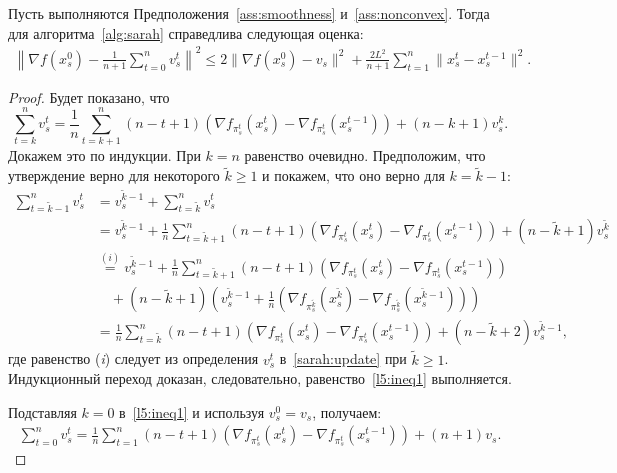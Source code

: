 \begin{lemma}\label{lemma5}
Пусть выполняются Предположения~\ref{ass:smoothness} и~\ref{ass:nonconvex}. Тогда для алгоритма~\ref{alg:sarah} справедлива следующая оценка:
\begin{align*}
    \left\| \nabla f(x_s^0) - \frac{1}{n+1}\sum\limits_{t=0}^n v_s^t\right\|^2 \leqslant 2\|\nabla f(x_{s}^0) - v_s \|^2 + \frac{2L^2}{n+1}\sum\limits_{t=1}^n \|x_s^t - x_s^{t-1}\|^2.
\end{align*}

\begin{proof}
Будет показано, что
\begin{equation}
\label{l5:ineq1}
    \sum\limits_{t=k}^n v_s^t = \frac{1}{n} \sum\limits_{t = k+1}^n (n-t+1)\left(\nabla f_{\pi_s^t}(x_s^t) - \nabla f_{\pi_s^t}(x_s^{t-1})\right) + (n-k+1)v_s^k.
\end{equation}
Докажем это по индукции. При $k = n$ равенство очевидно. Предположим, что утверждение верно для некоторого $\widetilde{k} \geqslant 1$ и покажем, что оно верно для $k = \widetilde{k}-1$:
\begin{align*}
    \sum\limits_{t=\widetilde{k}-1}^n v_s^t &= v_s^{\widetilde{k}-1} + \sum\limits_{t=\widetilde{k}}^n v_s^t \\
    &= v_s^{\widetilde{k}-1} + \frac{1}{n} \sum\limits_{t = \widetilde{k}+1}^n (n-t+1)\left(\nabla f_{\pi_s^t}(x_s^t) - \nabla f_{\pi_s^t}(x_s^{t-1})\right) + (n-\widetilde{k}+1)v_s^{\widetilde{k}} \\
    & \overset{(i)}{=} v_s^{\widetilde{k}-1} + \frac{1}{n} \sum\limits_{t = \widetilde{k}+1}^n (n-t+1)\left(\nabla f_{\pi_s^t}(x_s^t) - \nabla f_{\pi_s^t}(x_s^{t-1})\right) \\
    &\quad + (n-\widetilde{k}+1)\left(v_s^{\widetilde{k}-1} + \frac{1}{n} \left(\nabla f_{\pi_s^{\widetilde{k}}}(x_s^{\widetilde{k}}) - \nabla f_{\pi_s^{\widetilde{k}}}(x_s^{\widetilde{k}-1})\right)\right) \\
    &= \frac{1}{n} \sum\limits_{t = \widetilde{k}}^n (n-t+1)\left(\nabla f_{\pi_s^t}(x_s^t) - \nabla f_{\pi_s^t}(x_s^{t-1})\right) + (n-\widetilde{k}+2) v_s^{\widetilde{k}-1},
\end{align*}
где равенство (\textit{i}) следует из определения $v_s^t$ в~\eqref{sarah:update} при $\widetilde{k} \geqslant 1$. Индукционный переход доказан, следовательно, равенство~\eqref{l5:ineq1} выполняется.

Подставляя $k = 0$ в~\eqref{l5:ineq1} и используя $v_s^0 = v_s$, получаем:
\begin{align}
\label{l5:ineq2}
    \sum\limits_{t=0}^n v_s^t = \frac{1}{n} \sum\limits_{t = 1}^n (n-t+1)\left(\nabla f_{\pi_s^t}(x_s^t) - \nabla f_{\pi_s^t}(x_s^{t-1})\right) + (n+1) v_s.
\end{align}


\end{proof}
\end{lemma}
